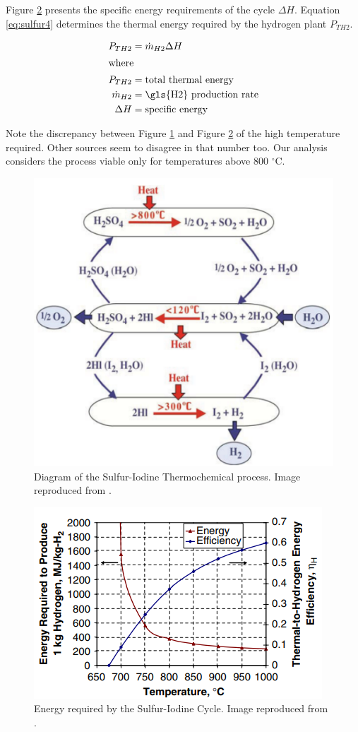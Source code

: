 \documentclass[11pt,letterpaper]{article}
\begin{document}
Figure \ref{fig:sulfur2} presents the specific energy requirements of the cycle $\Delta H$.
Equation \ref{eq:sulfur4} determines the thermal energy required by the hydrogen plant $P_{TH2}$.

\begin{align}
	P_{TH2} &= \dot{m}_{H2} \Delta H\\
	\label{eq:sulfur4}

	\intertext{where}
	P_{TH2} &= \mbox{total thermal energy} \\
	\dot{m}_{H2} &= \mbox{\gls{H2} production rate} \\
	\Delta H &= \mbox{specific energy} \\
\end{align}

Note the discrepancy between Figure \ref{fig:sulfur1} and Figure \ref{fig:sulfur2} of the high temperature required.
Other sources seem to disagree in that number too.
Our analysis considers the process viable only for temperatures above 800 $^{\circ}$C.

\begin{figure}[htbp!]
	\centering
	\includegraphics[width=0.7\linewidth]{figures/sulfur1.png}
	\hfill
	\caption{Diagram of the Sulfur-Iodine Thermochemical process. Image reproduced from \cite{benjamin_russ_sulfur_2009}.}
	\label{fig:sulfur1}
\end{figure}

\begin{figure}[htbp!]
	\centering
	\includegraphics[width=0.7\linewidth]{figures/si-energy.png}
	\hfill
	\caption{Energy required by the Sulfur-Iodine Cycle. Image reproduced from \cite{yildiz_efficiency_2006}.}
	\label{fig:sulfur2}
\end{figure}
\end{document}
